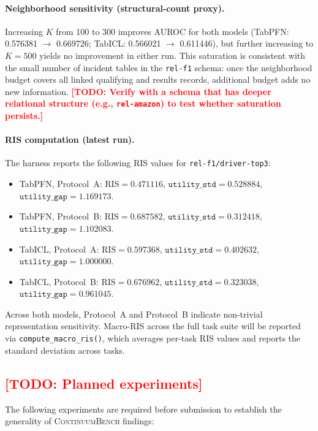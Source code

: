 \documentclass[11pt]{article}
\newcommand{\cb}{\textsc{ContinuumBench}}
\newcommand{\todo}[1]{\textcolor{red}{\textbf{[TODO: #1]}}}
\newcommand{\RIS}{\mathrm{RIS}}
\begin{document}
\paragraph{Neighborhood sensitivity (structural-count proxy).}
Increasing $K$ from 100 to 300 improves AUROC for both models
(TabPFN: 0.576381 \(\to\) 0.669726;
TabICL: 0.566021 \(\to\) 0.611446),
but further increasing to $K=500$ yields no improvement in either run.
This saturation is consistent with the small number of incident tables
in the \texttt{rel-f1} schema: once the neighborhood budget covers
all linked qualifying and results records, additional budget adds
no new information.
\todo{Verify with a schema that has deeper relational structure
(e.g., \texttt{rel-amazon}) to test whether saturation persists.}

\paragraph{RIS computation (latest run).}
The harness reports the following RIS values for
\texttt{rel-f1/driver-top3}:
\begin{itemize}
  \item TabPFN, Protocol~A: \(\RIS = 0.471116\),
        \(\texttt{utility\_std} = 0.528884\),
        \(\texttt{utility\_gap} = 1.169173\).
  \item TabPFN, Protocol~B: \(\RIS = 0.687582\),
        \(\texttt{utility\_std} = 0.312418\),
        \(\texttt{utility\_gap} = 1.102083\).
  \item TabICL, Protocol~A: \(\RIS = 0.597368\),
        \(\texttt{utility\_std} = 0.402632\),
        \(\texttt{utility\_gap} = 1.000000\).
  \item TabICL, Protocol~B: \(\RIS = 0.676962\),
        \(\texttt{utility\_std} = 0.323038\),
        \(\texttt{utility\_gap} = 0.961045\).
\end{itemize}
Across both models, Protocol~A and Protocol~B indicate non-trivial
representation sensitivity.
Macro-RIS across the full task suite will be reported via
\texttt{compute\_macro\_ris()}, which averages per-task RIS values and
reports the standard deviation across tasks.

\subsection{\todo{Planned experiments}}

The following experiments are required before submission to establish
the generality of \cb{} findings:
\end{document}
